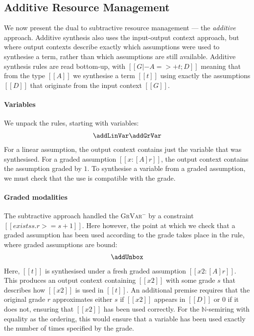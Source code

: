 \subsection{Additive Resource Management}
We now present the dual to subtractive resource management --- the
\emph{additive} approach.
Additive synthesis also uses the input-output context approach, but where
output contexts describe exactly which assumptions were used to synthesise
a term, rather than which assumptions are still available. Additive
   synthesis rules are read bottom-up, with $[[G |- A =>+ t; D]]$
  meaning that from the type $[[A]]$ we synthesise a term $[[t]]$ using
  exactly the assumptions $[[D]]$ that originate from the input
  context $[[G]]$.

  \paragraph{Variables}
  We unpack the rules, starting with variables:
%
\begin{align*}
  \addLinVar
  \addGrVar
  \end{align*}
%
For a linear assumption, the output context contains
just the variable that was synthesised. For a graded assumption $[[x : [A] r]]$, the output
context contains the assumption graded by $1$. To synthesise a
variable from a graded assumption, we must check that the use is
compatible with the grade.

\paragraph{Graded modalities}
The subtractive approach handled the \textsc{GrVar$^{-}$}
by a constraint $[[ exists s . r >= s + 1]]$. Here however, the
point at which we check that a graded assumption has been used
according to the grade takes place in the \addUnboxName rule, where graded
assumptions are bound:
%
\begin{align*}
  \addUnbox
  \end{align*}
%
Here, $[[t]]$ is synthesised under a fresh graded assumption
$[[ x2 : [A] r]]$. This produces an output context containing $[[x2]]$ with
some grade $s$ that describes how $[[x2]]$ is used in $[[t]]$. An
additional premise requires that the original grade $r$ approximates either $s$
if $[[x2]]$ appears in $[[D]]$ or $0$ if it does not,
ensuring that $[[x2]]$ has been used correctly. For the
$\mathbb{N}$-semiring with equality as the ordering, this would
ensure that a variable has been used exactly the number of times
specified by the grade.

